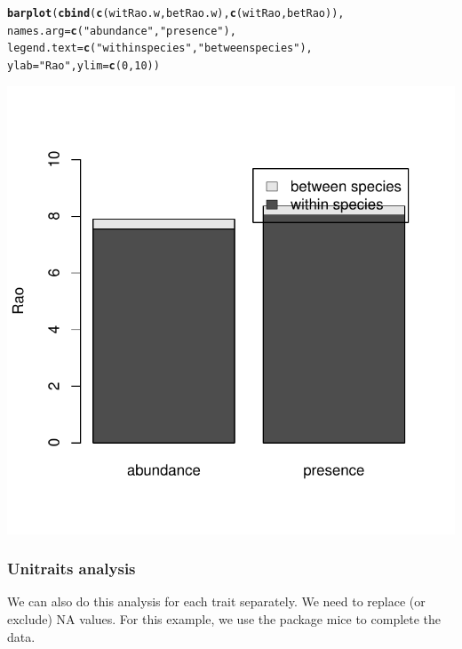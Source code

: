 \documentclass[12pt]{article}\usepackage[]{graphicx}\usepackage[]{color}
\makeatletter
\def\maxwidth{ %
  \ifdim\Gin@nat@width>\linewidth
    \linewidth
  \else
    \Gin@nat@width
  \fi
}
\newcommand{\hlnum}[1]{\textcolor[rgb]{0.686,0.059,0.569}{#1}}%
\newcommand{\hlstr}[1]{\textcolor[rgb]{0.192,0.494,0.8}{#1}}%
\newcommand{\hlstd}[1]{\textcolor[rgb]{0.345,0.345,0.345}{#1}}%
\newcommand{\hlkwc}[1]{\textcolor[rgb]{0.333,0.667,0.333}{#1}}%
\newcommand{\hlkwd}[1]{\textcolor[rgb]{0.737,0.353,0.396}{\textbf{#1}}}%
\newenvironment{kframe}{%
 \def\at@end@of@kframe{}%
 \ifinner\ifhmode%
  \def\at@end@of@kframe{\end{minipage}}%
  \begin{minipage}{\columnwidth}%
 \fi\fi%
 \def\FrameCommand##1{\hskip\@totalleftmargin \hskip-\fboxsep
 \colorbox{shadecolor}{##1}\hskip-\fboxsep
     \hskip-\linewidth \hskip-\@totalleftmargin \hskip\columnwidth}%
 \MakeFramed {\advance\hsize-\width
   \@totalleftmargin\z@ \linewidth\hsize
   \@setminipage}}%
 {\par\unskip\endMakeFramed%
 \at@end@of@kframe}
\newenvironment{knitrout}{}{} %
\makeatother
\begin{document}
\begin{knitrout}
\color{fgcolor}\begin{kframe}
\begin{alltt}
\hlkwd{barplot}\hlstd{(}\hlkwd{cbind}\hlstd{(}\hlkwd{c}\hlstd{(witRao.w, betRao.w),} \hlkwd{c}\hlstd{(witRao, betRao)),}
        \hlkwc{names.arg} \hlstd{=}\hlkwd{c}\hlstd{(}\hlstr{"abundance"} \hlstd{,}\hlstr{"presence"}\hlstd{),}
        \hlkwc{legend.text}\hlstd{=}\hlkwd{c}\hlstd{(}\hlstr{"within species"}\hlstd{,} \hlstr{"between species"}\hlstd{),}
        \hlkwc{ylab}\hlstd{=}\hlstr{"Rao"}\hlstd{,} \hlkwc{ylim}\hlstd{=}\hlkwd{c}\hlstd{(}\hlnum{0}\hlstd{,}\hlnum{10}\hlstd{))}
\end{alltt}
\end{kframe}

{\centering \includegraphics[width=\maxwidth]{figure/unnamed-chunk-18} 

}



\end{knitrout}


\subsubsection{Unitraits analysis}
We can also do this analysis for each trait separately. We need to replace (or exclude) NA values. For this example, we use the package mice to complete the data.
\end{document}
